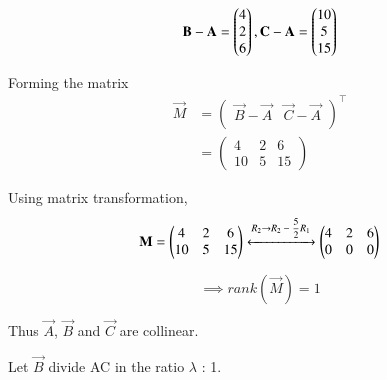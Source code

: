 
\begin{equation}
    \vec{B} - \vec{A} = \myvec{4\\2\\6}, \vec{C} - \vec{A} = \myvec{10\\5\\15}
\end{equation}

Forming the matrix 
\begin{align}
    \vec{M} &= \begin{pmatrix}
    \vec{B} - \vec{A} & \vec{C} - \vec{A}\\
    \end{pmatrix}^\top\\
    &= \begin{pmatrix}
    4 & 2 & 6\\
    10 & 5 & 15
    \end{pmatrix}
\end{align}

Using matrix transformation,
\begin{align}
\vec{M} = \begin{pmatrix}
    4 & 2 & 6\\
    10 & 5 & 15
    \end{pmatrix} \xleftrightarrow{\text{$R_2$}\rightarrow{\text{$R_2 - \dfrac{5}{2} R_1$ }}}
 \begin{pmatrix}
 4 & 2 & 6\\
 0 & 0 & 0
 \end{pmatrix}
\end{align}
 
\begin{equation}
   \implies rank(\vec{M}) = 1 
\end{equation}

Thus $\vec{A}$, $\vec{B}$ and $\vec{C}$ are collinear. 

Let $\vec{B}$ divide AC in the ratio $\lambda$ : 1. 

